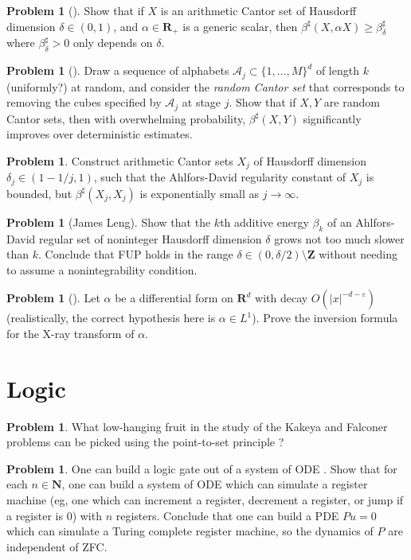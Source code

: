 \documentclass[reqno,11pt]{amsart}
\newcommand{\NN}{\mathbf{N}}
\newcommand{\ZZ}{\mathbf{Z}}
\newcommand{\RR}{\mathbf{R}}
\newcommand{\dfn}[1]{\emph{#1}\index{#1}}
\theoremstyle{definition}
\newtheorem{problem}[theorem]{Problem}
\numberwithin{equation}{section}
\begin{document}
\begin{problem}[{\cite[Conjecture 4.5]{Dyatlov_2019}}]
Show that if $X$ is an arithmetic Cantor set of Hausdorff dimension $\delta \in (0, 1)$, and $\alpha \in \RR_+$ is a generic scalar, then $\beta^\sharp(X, \alpha X) \geq \beta^\sharp_\delta$ where $\beta^\sharp_\delta > 0$ only depends on $\delta$.
\end{problem}

\begin{problem}[{\cite[\S4]{eswarathasan2021fractal}}]
Draw a sequence of alphabets $\mathcal A_j \subset \{1, \dots, M\}^d$ of length $k$ (uniformly?) at random, and consider the \dfn{random Cantor set} that corresponds to removing the cubes specified by $\mathcal A_j$ at stage $j$.
Show that if $X, Y$ are random Cantor sets, then with overwhelming probability, $\beta^\sharp(X, Y)$ significantly improves over deterministic estimates.
\end{problem}

\begin{problem}
Construct arithmetic Cantor sets $X_j$ of Hausdorff dimension $\delta_j \in (1 - 1/j, 1)$, such that the Ahlfors-David regularity constant of $X_j$ is bounded, but $\beta^\sharp(X_j, X_j)$ is exponentially small as $j \to \infty$.
\end{problem}

\begin{problem}[James Leng]
Show that the $k$th additive energy $\beta_k$ of an Ahlfors-David regular set of noninteger Hausdorff dimension $\delta$ grows not too much slower than $k$.
Conclude that FUP holds in the range $\delta \in (0, \delta/2) \setminus \ZZ$ without needing to assume a nonintegrability condition.
\end{problem}

\begin{problem}[{\cite{Solomon11}}]
Let $\alpha$ be a differential form on $\RR^d$ with decay $O(|x|^{-d-\varepsilon})$ (realistically, the correct hypothesis here is $\alpha \in L^1$).
Prove the inversion formula for the X-ray transform of $\alpha$.
\end{problem}


\section{Logic}
\begin{problem}
What low-hanging fruit in the study of the Kakeya and Falconer problems can be picked using the point-to-set principle \cite{Lutz18}?
\end{problem}

\begin{problem}
One can build a logic gate out of a system of ODE \cite{Tao16}.
Show that for each $n \in \NN$, one can build a system of ODE which can simulate a register machine (eg, one which can increment a register, decrement a register, or jump if a register is $0$) with $n$ registers.
Conclude that one can build a PDE $Pu = 0$ which can simulate a Turing complete register machine, so the dynamics of $P$ are independent of ZFC.
\end{problem}



\printbibliography
\end{document}
